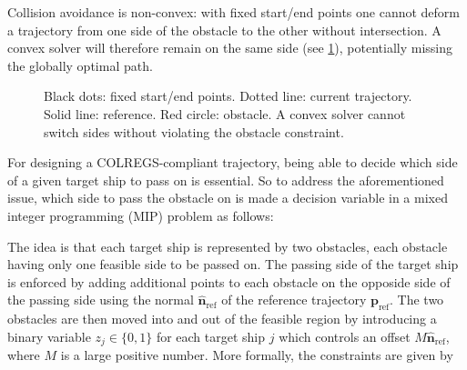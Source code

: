 Collision avoidance is non-convex: with fixed start/end points one cannot deform a trajectory from one side of the obstacle to the other without intersection. A convex solver will therefore remain on the same side (see \cref{fig:non-convex-obstacle}), potentially missing the globally optimal path.
\begin{figure}
    \centering
    
    \caption{Black dots: fixed start/end points. Dotted line: current trajectory. Solid line: reference. Red circle: obstacle. A convex solver cannot switch sides without violating the obstacle constraint.}
    \label{fig:non-convex-obstacle}
\end{figure}

For designing a COLREGS-compliant trajectory, being able to decide which side of a given target ship to pass on is essential. So to address the aforementioned issue, which side to pass the obstacle on is made a decision variable in a mixed integer programming (MIP) problem as follows:

The idea is that each target ship is represented by two obstacles, each obstacle having only one feasible side to be passed on. The passing side of the target ship is enforced by adding additional points to each obstacle on the opposide side of the passing side using the normal $\mathbf{\hat n}_\text{ref}$ of the reference trajectory $\mathbf p_\text{ref}$. The two obstacles are then moved into and out of the feasible region by introducing a binary variable $z_j\in\{0,1\}$ for each target ship $j$ which controls an offset $M \mathbf{\hat n}_\text{ref}$, where $M$ is a large positive number. More formally, the constraints are given by

